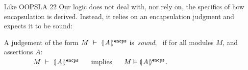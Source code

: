 
Like OOPSLA 22 Our logic does not {deal with, nor} rely on, the specifics of  how   encapsulation
{is derived}.
{Instead, it relies} on an encapsulation judgment and expects it to be sound:

\begin{definition}
\label{lem:encap-soundness}
A judgement of the form $M\ \vdash\ \llparenthesis\, A\, \rrparenthesis^{\texttt{encps}}$  is\  \emph{sound}, \ if 
for all modules $M$, and assertions $A$:\\

$\strut \hspace{1.5cm} M\ \vdash\ \llparenthesis\, A\, \rrparenthesis^{\texttt{encps}} \ \ \ \ $ implies $\ \ \ \ \satisfies{M}{\encaps{A}}$.
\end{definition}





